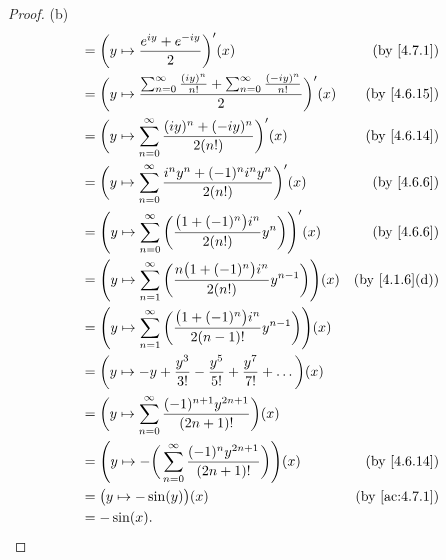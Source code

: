 \begin{proof}{(b)}
\begin{align*}
     & = \bigg(y \mapsto \frac{e^{i y} + e^{- i y}}{2}\bigg)'(x)                                                               & \text{(by \cref{4.7.1})}    \\
     & = \bigg(y \mapsto \frac{\sum_{n = 0}^\infty \frac{(i y)^n}{n!} + \sum_{n = 0}^\infty \frac{(- i y)^n}{n!}}{2}\bigg)'(x) & \text{(by \cref{4.6.15})}   \\
     & = \bigg(y \mapsto \sum_{n = 0}^\infty \frac{(i y)^n + (- i y)^n}{2 (n!)}\bigg)'(x)                                      & \text{(by \cref{4.6.14})}   \\
     & = \bigg(y \mapsto \sum_{n = 0}^\infty \frac{i^n y^n + (-1)^n i^n y^n}{2 (n!)}\bigg)'(x)                                 & \text{(by \cref{4.6.6})}    \\
     & = \Bigg(y \mapsto \sum_{n = 0}^\infty \bigg(\frac{\big(1 + (-1)^n\big) i^n}{2 (n!)} y^n\bigg)\Bigg)'(x)                 & \text{(by \cref{4.6.6})}    \\
     & = \Bigg(y \mapsto \sum_{n = 1}^\infty \bigg(\frac{n \big(1 + (-1)^n\big) i^n}{2 (n!)} y^{n - 1}\bigg)\Bigg)(x)          & \text{(by \cref{4.1.6}(d))} \\
     & = \Bigg(y \mapsto \sum_{n = 1}^\infty \bigg(\frac{\big(1 + (-1)^n\big) i^n}{2 (n - 1)!} y^{n - 1}\bigg)\Bigg)(x)                                      \\
     & = \bigg(y \mapsto -y + \frac{y^3}{3!} - \frac{y^5}{5!} + \frac{y^7}{7!} + \dots\bigg)(x)                                                              \\
     & = \bigg(y \mapsto \sum_{n = 0}^\infty \frac{(-1)^{n + 1} y^{2n + 1}}{(2n + 1)!}\bigg)(x)                                                              \\
     & = \Bigg(y \mapsto -\bigg(\sum_{n = 0}^\infty \frac{(-1)^n y^{2n + 1}}{(2n + 1)!}\bigg)\Bigg)(x)                         & \text{(by \cref{4.6.14})}   \\
     & = \big(y \mapsto -\sin(y)\big)(x)                                                                                       & \text{(by \cref{ac:4.7.1})} \\
     & = -\sin(x).
  \end{align*}
\end{proof}

